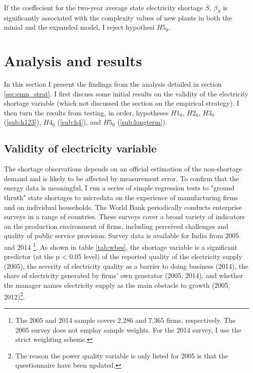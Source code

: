\documentclass[11pt]{article}
\begin{document}
If the coeffecient for the two-year average state electricity shortage $\bar{S}$, $\beta_{\bar{S}}$ is significantly associated with the complexity values of new plants in both the minial and the expanded model, I reject hypothesi $H5_0$.


\newpage

\section{Analysis and results}%
\label{sec:analysis_and_results}
In this section I present the findings from the analysis detailed in section \ref{sec:emp_strat}. I first discuss some initial results on the validity of the electricity shortage variable (which not discussed the section on the empirical strategy). I then turn the results from testing, in order, hypotheses $H1_0$, $H2_0$, $H3_0$ (\ref{sub:h123}), $H4_0$ (\ref{sub:h4}), and $H5_0$ (\ref{sub:longterm}).

\subsection{Validity of electricity variable}%
\label{sub:validity_of_electricity_variable}

The shortage observations depends on an official estimation of the non-shortage demand and is likely to be affected by measurement error. To confirm that the energy data is meaningful, I run a series of simple regression tests to "ground thruth" state shortages to microdata on the experience of manufacturing firms and on individual households. 
The World Bank periodically conducts enterprise surveys in a range of countries. These surveys cover a broad variety of indicators on the production environment of firms, including perceived challenges and quality of public service provision. Survey data is available for India from 2005 and 2014 \citep{world_bank_enterprise_2020-1,world_bank_enterprise_2020-2}\footnote{The 2005 and 2014 sample covers 2,286 and 7,365 firms, respectively. The 2005 survey does not employ sample weights. For the 2014 survey, I use the strict weighting scheme.}. As shown in table \ref{tab:wbes}, the shortage variable is a significant predictor (at the p < 0.05 level) of the reported quality of the electricity supply (2005), the severity of electricity quality as a barrier to doing business (2014), the share of electricity generated by firms' own generator (2005, 2014), and whether the manager names electricity supply as the main obstacle to growth (2005, 2012)\footnote{The reason the power quality variable is only listed for 2005 is that the questionnaire have been updated.}.
\end{document}
